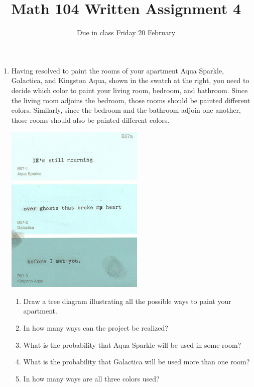 \documentclass[11pt]{article}
\author{}\date{Due in class Friday 20 February}
\title{Math 104 Written Assignment 4}\author{}
\begin{document}
\maketitle
\thispagestyle{empty}
\begin{enumerate}
\item
\begin{multicols}{2}
Having resolved to paint the rooms of your apartment
Aqua Sparkle, Galactica, and Kingston Aqua,
shown in the swatch at the right, you need to decide which color
to paint your living room, bedroom, and bathroom.
Since the living room adjoins the bedroom, those rooms should
be painted different colors. Similarly, since
the bedroom and the bathroom adjoin one another,
those rooms should also be painted different colors.
\begin{center}\includegraphics[scale=.5]{Swatch}\end{center}
\end{multicols}
\begin{enumerate}
\item Draw a tree diagram illustrating all the possible ways
to paint your apartment.
\item In how many ways can the project be realized?
\item What is the probability that Aqua Sparkle will be used in some room?
\item What is the probability that Galactica will be used more than one room?
\item In how many ways are all three colors used?
\end{enumerate}


\end{enumerate}
\end{document}
